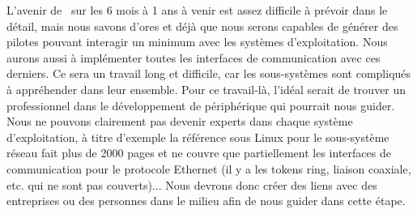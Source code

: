 \documentclass[francais]{rtxreport}
\begin{document}
L’avenir de \rtx\ sur les 6 mois à 1 ans à venir est assez difficile à prévoir
dans le détail, mais nous savons d’ores et déjà que nous serons capables de
générer des pilotes pouvant interagir un minimum avec les systèmes
d’exploitation. Nous aurons aussi à implémenter toutes les interfaces de
communication avec ces derniers. Ce sera un travail long et difficile, car les
sous-systèmes sont compliqués à appréhender dans leur ensemble. Pour ce
travail-là, l’idéal serait de trouver un professionnel dans le développement de
périphérique qui pourrait nous guider. Nous ne pouvons clairement pas devenir
experts dans chaque système d’exploitation, à titre d’exemple la référence sous
Linux pour le sous-système réseau fait plus de 2000 pages et ne couvre que
partiellement les interfaces de communication pour le protocole Ethernet (il y
a les tokens ring, liaison coaxiale, etc. qui ne sont pas couverts)...  Nous
devrons donc créer des liens avec des entreprises ou des personnes dans le
milieu afin de nous guider dans cette étape.
\end{document}
